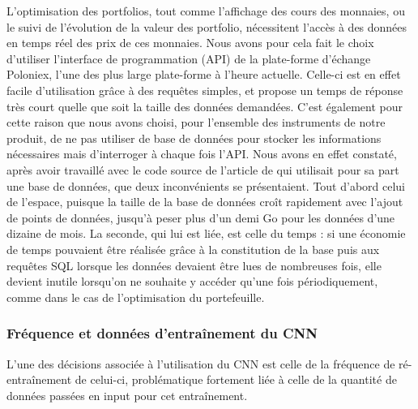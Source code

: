 \documentclass[a4paper, 10pt]{article}
\begin{document}
L'optimisation des portfolios, tout comme l'affichage des cours des monnaies, ou le suivi de l'évolution de la valeur des portfolio, nécessitent l'accès à des données en temps réel des prix de ces monnaies. Nous avons pour cela fait le choix d'utiliser l'interface de programmation (API) de la plate-forme d'échange Poloniex, l'une des plus large plate-forme à l'heure actuelle. Celle-ci est en effet facile d'utilisation grâce à des requêtes simples, et propose un temps de réponse très court quelle que soit la taille des données demandées. C'est également pour cette raison que nous avons choisi, pour l'ensemble des instruments de notre produit, de ne pas utiliser de base de données pour stocker les informations nécessaires mais d'interroger à chaque fois l'API. Nous avons en effet constaté, après avoir travaillé avec le code source de l'article de \citet{Jiang2017} qui utilisait pour sa part une base de données, que deux inconvénients se présentaient. Tout d'abord celui de l'espace, puisque la taille de la base de données croît rapidement avec l'ajout de points de données, jusqu'à peser plus d'un demi Go pour les données d'une dizaine de mois. La seconde, qui lui est liée, est celle du temps : si une économie de temps pouvaient être réalisée grâce à la constitution de la base puis aux requêtes SQL lorsque les données devaient être lues de nombreuses fois, elle devient inutile lorsqu'on ne souhaite y accéder qu'une fois périodiquement, comme dans le cas de l'optimisation du portefeuille.

\subsubsection{Fréquence et données d'entraînement du CNN}
\label{sec:developpement_choix_train}

L'une des décisions associée à l'utilisation du CNN est celle de la fréquence de ré-entraînement de celui-ci, problématique fortement liée à celle de la quantité de données passées en input pour cet entraînement. 
\end{document}
